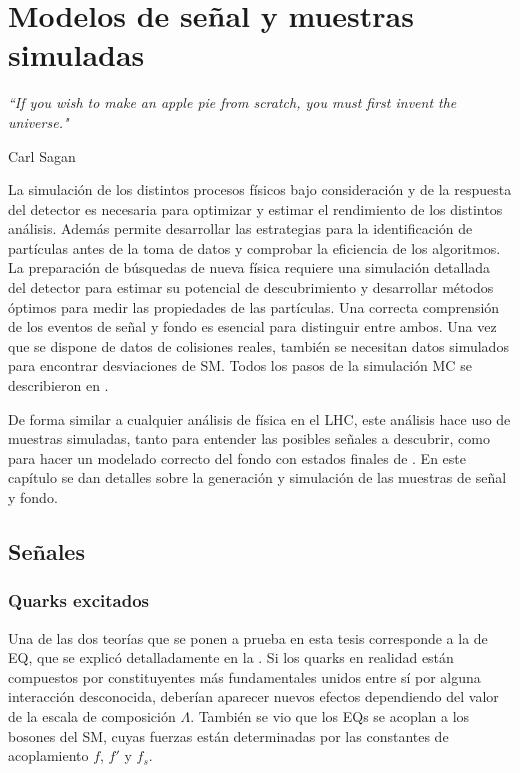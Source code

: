 \chapter{Modelos de señal y muestras simuladas}
\label{ch:samples}
\epigraph{\emph{``If you wish to make an apple pie from scratch, you must first invent the universe."}}{Carl Sagan}


La simulación de los distintos procesos físicos bajo consideración y de la respuesta del detector es necesaria para optimizar y estimar el rendimiento de los distintos análisis. Además permite desarrollar las estrategias para la identificación de partículas antes de la toma de datos y comprobar la eficiencia de los algoritmos. La preparación de búsquedas de nueva física requiere una simulación detallada del detector para estimar su potencial de descubrimiento y desarrollar métodos óptimos para medir las propiedades de las partículas. Una correcta comprensión de los eventos de señal y fondo es esencial para distinguir entre ambos. Una vez que se dispone de datos de colisiones reales, también se necesitan datos simulados para encontrar desviaciones de \ac{SM}. Todos los pasos de la simulación \ac{MC} se describieron en \Sect{\ref{sec:theory:mc_simulation}}.

De forma similar a cualquier análisis de física en el \ac{LHC}, este análisis hace uso de muestras simuladas, tanto para entender las posibles señales a descubrir, como para hacer un modelado correcto del fondo con estados finales de \gammajet.
En este capítulo se dan detalles sobre la generación y simulación de las muestras de señal y fondo.


\section{Señales}
\label{sec:samples:samples:sig}

\subsection{Quarks excitados}
\label{subsec:samples:samples:sig:qstar}

Una de las dos teorías que se ponen a prueba en esta tesis corresponde a la de \acf{EQ}, que se explicó detalladamente en la \Sect{\ref{subsec:theory:bsm:qstar}}. Si los quarks en realidad están compuestos por constituyentes más fundamentales unidos entre sí por alguna interacción desconocida, deberían aparecer nuevos efectos dependiendo del valor de la escala de composición \(\Lambda\).
También se vio que los \acp{EQ} se acoplan a los bosones del \ac{SM}, cuyas fuerzas están determinadas por las constantes de acoplamiento \(f\), \(f'\) y \(f_s\).

